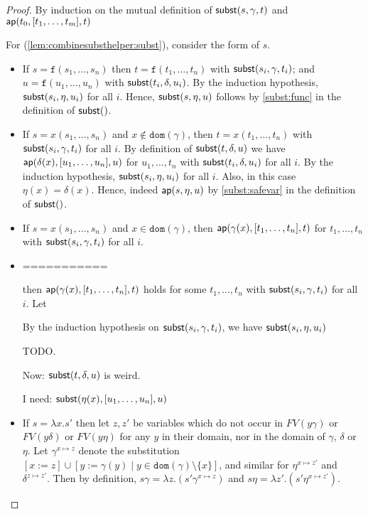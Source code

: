 \documentclass{lmcs}
\theoremstyle{theorem}\newtheorem{theorem}[dummy]{Theorem}
\theoremstyle{theorem}\newtheorem{lemma}[dummy]{Lemma}
\theoremstyle{theorem}\newtheorem{corollary}[dummy]{Corollary}
\theoremstyle{definition}\newtheorem{definition}[dummy]{Definition}
\theoremstyle{definition}\newtheorem{example}[dummy]{Example}
\newcommand{\FV}{\mathit{FV}}
\newcommand{\domain}{\mathtt{dom}}
\newcommand{\identifier}[1]{\mathtt{#1}}
\newcommand{\afun}{\identifier{f}}
\newcommand{\abs}[2]{\lambda #1.#2}
\begin{document}
\begin{proof}
By induction on the mutual definition of $\mathsf{subst}(s,\gamma,t)$ and $\mathsf{ap}(t_0,[t_1,\dots,t_m],t)$

For (\ref{lem:combinesubsthelper:subst}), consider the form of $s$.

\begin{itemize}
\item If $s = \afun(s_1,\dots,s_n)$ then $t = \afun(t_1,\dots,t_n)$ with $\mathsf{subst}(s_i,\gamma,t_i)$;
  and $u = \afun(u_1,\dots,u_n)$ with $\mathsf{subst}(t_i,\delta,u_i)$.  By the induction hypothesis,
  $\mathsf{subst}(s_i,\eta,u_i)$ for all $i$.  Hence, $\mathsf{subst}(s,\eta,u)$ follows by \ref{subst:func} in
  the definition of $\mathsf{subst}()$.
\item If $s = x(s_1,\dots,s_n)$ and $x \notin \domain(\gamma)$, then $t = x(t_1,\dots,t_n)$ with
  $\mathsf{subst}(s_i,\gamma,t_i)$ for all $i$.  By definition of $\mathsf{subst}(t,\delta,u)$ we have
  $\mathsf{ap}(\delta(x),[u_1,\dots,u_n],u)$ for $u_1,\dots,t_n$ with $\mathsf{subst}(t_i,\delta,u_i)$ for all
  $i$. By the induction hypothesis, $\mathsf{subst}(s_i,\eta,u_i)$ for all $i$.  Also, in this case
  $\eta(x) = \delta(x)$.  Hence, indeed $\mathsf{ap}(s,\eta,u)$ by \ref{subst:safevar} in the definition
  of $\mathsf{subst}()$.
\item If $s = x(s_1,\dots,s_n)$ and $x \in \domain(\gamma)$, then $\mathsf{ap}(\gamma(x),[t_1,\dots,t_n],
  t)$ for $t_1,\dots,t_n$ with $\mathsf{subst}(s_i,\gamma,t_i)$ for all $i$.
\item  ===========

then $\mathsf{ap}(\gamma(x),[t_1,\dots,t_n],t)$ holds for some $t_1,
  \dots,t_n$ with $\mathsf{subst}(s_i,\gamma,t_i)$ for all $i$.
  Let



  By the induction hypothesis on $\mathsf{subst}(s_i,\gamma,t_i)$, we have $\mathsf{subst}(s_i,\eta,u_i)$

  TODO.

  Now: $\mathsf{subst}(t,\delta,u)$ is weird.

  I need: $\mathsf{subst}(\eta(x),[u_1,\dots,u_n],u)$

\item If $s = \abs{x}{s'}$ then let $z,z'$ be variables which do not occur in $\FV(y\gamma)$ or
  $\FV(y\delta)$ or $\FV(y\eta)$ for any $y$ in their domain, nor in the domain of $\gamma$,
  $\delta$ or $\eta$.
  Let $\gamma^{x\mapsto z}$ denote the substitution $[x:=z] \cup [y := \gamma(y) \mid y \in
  \domain(\gamma) \setminus \{x\}]$, and similar for $\eta^{x \mapsto z'}$ and $\delta^{z
  \mapsto z'}$.
  Then by definition, $s\gamma = \abs{z}{(s'\gamma^{x\mapsto z})}$ and $s\eta =
  \abs{z'}{(s'\eta^{x\mapsto z'})}$.


\end{itemize}
\end{proof}
\end{document}
